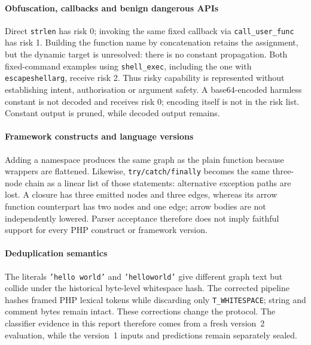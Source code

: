 \paragraph{Obfuscation, callbacks and benign dangerous APIs}
Direct \texttt{strlen} has risk 0; invoking the same fixed callback via \texttt{call\_user\_func} has risk 1.
Building the function name by concatenation retains the assignment, but the dynamic target is unresolved:
there is no constant propagation. Both fixed-command examples using \texttt{shell\_exec}, including the
one with \texttt{escapeshellarg}, receive risk 2. Thus risky capability is represented without establishing
intent, authorisation or argument safety. A base64-encoded harmless constant is not decoded and receives
risk 0; encoding itself is not in the risk list. Constant output is pruned, while decoded output remains.

\paragraph{Framework constructs and language versions}
Adding a namespace produces the same graph as the plain function because wrappers are flattened.
Likewise, \texttt{try/catch/finally} becomes the same three-node chain as a linear list of those statements:
alternative exception paths are lost. A closure has three emitted nodes and three edges, whereas its arrow
function counterpart has two nodes and one edge; arrow bodies are not independently lowered. Parser
acceptance therefore does not imply faithful support for every PHP construct or framework version.

\paragraph{Deduplication semantics}
The literals \texttt{'hello world'} and \texttt{'helloworld'} give different graph text but collide under
the historical byte-level whitespace hash. The corrected pipeline hashes framed PHP lexical tokens while
discarding only \texttt{T\_WHITESPACE}; string and comment bytes remain intact. These corrections change the protocol. The classifier evidence in this report therefore comes from
a fresh version~2 evaluation, while the version~1 inputs and predictions remain separately sealed.

